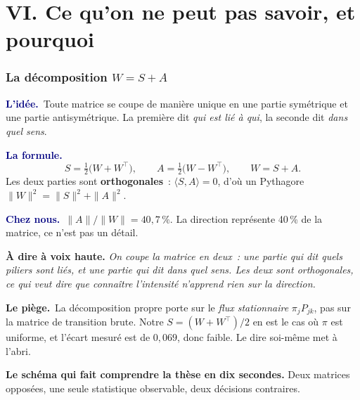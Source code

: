 \documentclass[11pt,a4paper]{article}
\newcommand{\lidee}[1]{\smallskip\noindent\textcolor{navy}{\textbf{L'idée.}}\ #1\par}
\newcommand{\laformule}[1]{\smallskip\noindent\textcolor{navy}{\textbf{La formule.}}\ #1\par}
\newcommand{\cheznous}[1]{\smallskip\noindent\textcolor{navy}{\textbf{Chez nous.}}\ #1\par}
\newcommand{\lepiege}[1]{\smallskip\noindent\textcolor{accent}{\textbf{Le piège.}}\ #1\par}
\newcommand{\laphrase}[1]{\begin{phrasebox}\textbf{À dire à voix haute.} \emph{#1}\end{phrasebox}}
\begin{document}
\part*{VI. Ce qu'on ne peut pas savoir, et pourquoi}

\section{La décomposition $W = S + A$}

\lidee{Toute matrice se coupe de manière unique en une partie symétrique et une partie
antisymétrique. La première dit \emph{qui est lié à qui}, la seconde dit \emph{dans quel
sens}.}

\laformule{
\[
  S=\tfrac12\bigl(W+W^{\top}\bigr), \qquad A=\tfrac12\bigl(W-W^{\top}\bigr),
  \qquad W=S+A .
\]
Les deux parties sont \textbf{orthogonales}~: $\langle S,A\rangle=0$, d'où un Pythagore
$\|W\|^2=\|S\|^2+\|A\|^2$.}

\cheznous{$\|A\|/\|W\| = 40{,}7\,\%$. La direction représente 40\,\% de la matrice, ce n'est
pas un détail.}

\laphrase{On coupe la matrice en deux~: une partie qui dit quels piliers sont liés, et une
partie qui dit dans quel sens. Les deux sont orthogonales, ce qui veut dire que connaître
l'intensité n'apprend rien sur la direction.}

\lepiege{La décomposition propre porte sur le \emph{flux stationnaire} $\pi_j P_{jk}$, pas
sur la matrice de transition brute. Notre $S=(W+W^{\top})/2$ en est le cas où $\pi$ est
uniforme, et l'écart mesuré est de $0{,}069$, donc faible. Le dire soi-même met à l'abri.}

\medskip
\noindent\textbf{Le schéma qui fait comprendre la thèse en dix secondes.} Deux matrices
opposées, une seule statistique observable, deux décisions contraires.
\end{document}
